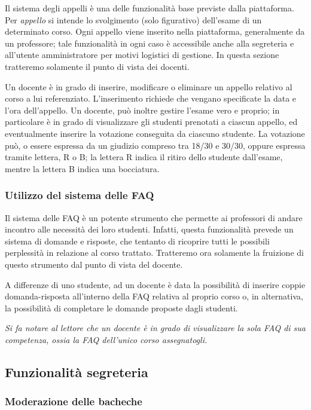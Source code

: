 \documentclass [a4paper,11pt]{book}
\begin{document}
Il sistema degli appelli è una delle funzionalità base previste dalla piattaforma. Per \emph{appello} si intende lo svolgimento (solo figurativo) dell'esame di un determinato corso. Ogni appello viene inserito nella piattaforma, generalmente da un professore; tale funzionalità in ogni caso è accessibile anche alla segreteria e all'utente amministratore per motivi logistici di gestione. In questa sezione tratteremo solamente il punto di vista dei docenti.

Un docente è in grado di inserire, modificare o eliminare un appello relativo al corso a lui referenziato. L'inserimento richiede che vengano specificate la data e l'ora dell'appello. 
Un docente, può inoltre gestire l'esame vero e proprio; in particolare è in grado di visualizzare gli studenti prenotati a ciascun appello, ed eventualmente inserire la votazione conseguita da ciascuno studente. La votazione può, o essere espressa da un giudizio compreso tra 18/30 e 30/30, oppure espressa tramite lettera, R o B; la lettera R indica il ritiro dello studente dall'esame, mentre la lettera B indica una bocciatura.

\medskip

\subsubsection{Utilizzo del sistema delle FAQ}

Il sistema delle FAQ è un potente strumento che permette ai professori di andare incontro alle necessità dei loro studenti. Infatti, questa funzionalità prevede un sistema di domande e risposte, che tentanto di ricoprire tutti le possibili perplessità in relazione al corso trattato. Tratteremo ora solamente la fruizione di questo strumento dal punto di vista del docente.

A differenze di uno studente, ad un docente è data la possibilità di inserire coppie domanda-risposta all'interno della FAQ relativa al proprio corso o, in alternativa, la possibilità di completare le domande proposte dagli studenti.

\emph{Si fa notare al lettore che un docente è in grado di visualizzare la sola FAQ di sua competenza, ossia la FAQ dell'unico corso assegnatogli.}
\medskip

\subsection{Funzionalità segreteria}

\subsubsection{Moderazione delle bacheche}
\end{document}
